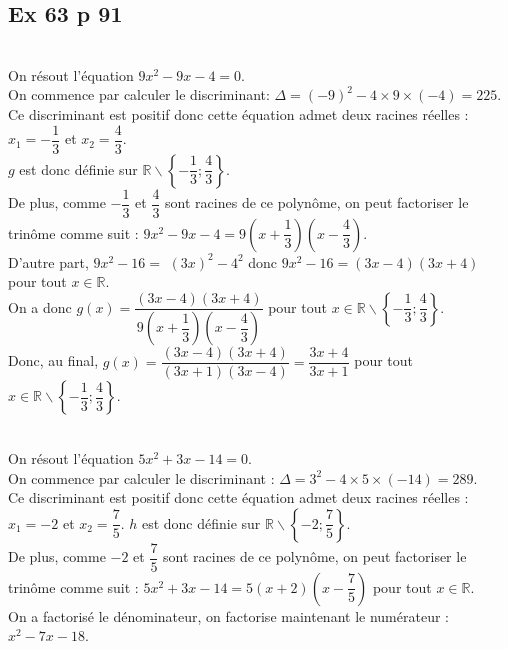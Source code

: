 \documentclass[12pt,a4paper]{book}
\begin{document}
\subsection*{Ex 63 p 91}
\begin{enumMet}
	\item {}\\
	On résout l'équation $9 x^2-9 x-4=0$.\\
	On commence par calculer le discriminant: $\Delta=(-9)^2-4 \times 9 \times(-4)=225$.\\
	Ce discriminant est positif donc cette équation admet deux racines réelles : $x_1=-\dfrac{1}{3}$ et $x_2=\dfrac{4}{3}$.\\
	$g$ est donc définie sur $\mathbb{R} \backslash\left\{-\dfrac{1}{3} ; \dfrac{4}{3}\right\}$.\\
	De plus, comme $-\dfrac{1}{3}$ et $\dfrac{4}{3}$ sont racines de ce polynôme, on peut factoriser le trinôme comme suit : $9 x^2-9 x-4=9\left(x+\dfrac{1}{3}\right)\left(x-\dfrac{4}{3}\right)$.\\
	D'autre part, $9 x^2-16=$ $(3 x)^2-4^2$ donc $9 x^2-16=(3 x-4)(3 x+4)$ pour tout $x \in \mathbb{R}$.\\
	On a donc $g(x)=\dfrac{(3 x-4)(3 x+4)}{9\left(x+\dfrac{1}{3}\right)\left(x-\dfrac{4}{3}\right)}$ pour tout $x \in \mathbb{R} \backslash\left\{-\dfrac{1}{3} ; \dfrac{4}{3}\right\}$.\\
	Donc, au final, $g(x)=\dfrac{(3 x-4)(3 x+4)}{(3 x+1)(3 x-4)}=\dfrac{3 x+4}{3 x+1}$ pour tout $x \in \mathbb{R} \backslash\left\{-\dfrac{1}{3} ; \dfrac{4}{3}\right\}$.
	\item {}\\
	On résout l'équation $5 x^2+3 x-14=0$.\\
	On commence par calculer le discriminant : $\Delta=3^2-4 \times 5 \times(-14)=289$.\\
	Ce discriminant est positif donc cette équation admet deux racines réelles : $x_1=-2$ et $x_2=\dfrac{7}{5}$. $h$ est donc définie sur $\mathbb{R} \backslash\left\{-2 ; \dfrac{7}{5}\right\}$.\\
	De plus, comme $-2$ et $\dfrac{7}{5}$ sont racines de ce polynôme, on peut factoriser le trinôme comme suit : $5 x^2+3 x-14=5(x+2)\left(x-\dfrac{7}{5}\right)$ pour tout $x \in \mathbb{R}$.\\
	On a factorisé le dénominateur, on factorise maintenant le numérateur : $x^2-7 x-18$.\\

\end{enumMet}
\end{document}

